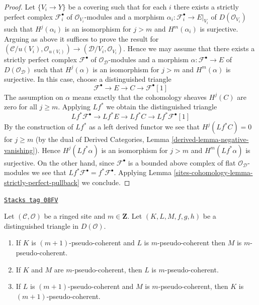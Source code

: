\begin{proof}
\medskip\noindent
Let $\{V_i \to Y\}$ be a covering such that for each $i$ there exists
a strictly perfect complex $\mathcal{F}_i^\bullet$ of
$\mathcal{O}_{V_i}$-modules and a morphism
$\alpha_i : \mathcal{F}_i^\bullet \to E|_{V_i}$ of $D(\mathcal{O}_{V_i})$
such that $H^j(\alpha_i)$ is an isomorphism
for $j > m$ and $H^m(\alpha_i)$ is surjective.
Arguing as above it suffices to prove the result for
$(\mathcal{C}/u(V_i), \mathcal{O}_{u(V_i)}) \to
(\mathcal{D}/V_i, \mathcal{O}_{V_i})$. Hence we may assume that
there exists a strictly perfect complex $\mathcal{F}^\bullet$ of
$\mathcal{O}_\mathcal{D}$-modules and a morphism
$\alpha : \mathcal{F}^\bullet \to E$ of $D(\mathcal{O}_\mathcal{D})$
such that $H^j(\alpha)$ is an isomorphism
for $j > m$ and $H^m(\alpha)$ is surjective. In this case, choose
a distinguished triangle
$$
\mathcal{F}^\bullet \to E \to C \to \mathcal{F}^\bullet[1]
$$
The assumption on $\alpha$ means exactly that the cohomology sheaves
$H^j(C)$ are zero for all $j \geq m$. Applying $Lf^*$ we obtain
the distinguished triangle
$$
Lf^*\mathcal{F}^\bullet \to Lf^*E \to Lf^*C \to Lf^*\mathcal{F}^\bullet[1]
$$
By the construction of $Lf^*$ as a left derived functor we see that
$H^j(Lf^*C) = 0$ for $j \geq m$ (by the dual of Derived Categories, Lemma
\ref{derived-lemma-negative-vanishing}). Hence $H^j(Lf^*\alpha)$ is an
isomorphism for $j > m$ and $H^m(Lf^*\alpha)$ is surjective.
On the other hand, since
$\mathcal{F}^\bullet$ is a bounded above complex of flat
$\mathcal{O}_\mathcal{D}$-modules we see that
$Lf^*\mathcal{F}^\bullet = f^*\mathcal{F}^\bullet$.
Applying Lemma \ref{sites-cohomology-lemma-strictly-perfect-pullback} we conclude.
\end{proof}

\begin{lemma}
\label{sites-cohomology-lemma-cone-pseudo-coherent}
\href{https://stacks.math.columbia.edu/tag/08FV}{\texttt{Stacks tag 08FV}}

Let $(\mathcal{C}, \mathcal{O})$ be a ringed site and $m \in \mathbf{Z}$.
Let $(K, L, M, f, g, h)$ be a distinguished triangle in $D(\mathcal{O})$.
\begin{enumerate}
\item If $K$ is $(m + 1)$-pseudo-coherent and $L$ is $m$-pseudo-coherent
then $M$ is $m$-pseudo-coherent.
\item If $K$ and $M$ are $m$-pseudo-coherent, then $L$ is $m$-pseudo-coherent.
\item If $L$ is $(m + 1)$-pseudo-coherent and $M$
is $m$-pseudo-coherent, then $K$ is $(m + 1)$-pseudo-coherent.
\end{enumerate}
\end{lemma}

